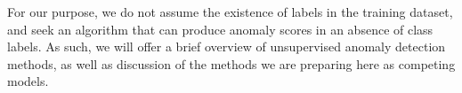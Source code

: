 For our purpose, we do not assume the existence of labels in the training 
    dataset, and seek an algorithm that can produce anomaly scores in an absence 
    of class labels. As such, we will offer a brief overview of unsupervised 
    anomaly detection methods, as well as discussion of the methods we are 
    preparing here as competing models.







